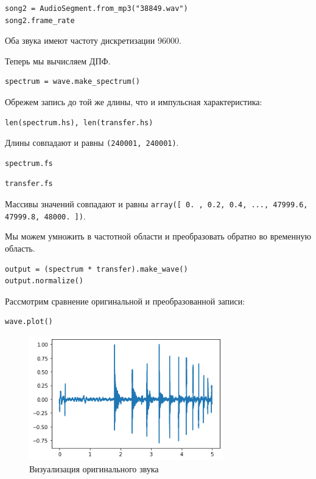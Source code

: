 \documentclass[a4paper,12pt]{report}
\begin{document}
\begin{lstlisting}[caption=Частота дискретизации 2]
song2 = AudioSegment.from_mp3("38849.wav")
song2.frame_rate
\end{lstlisting}

Оба звука имеют частоту дискретизации 96000.

Теперь мы вычисляем ДПФ.

\begin{lstlisting}[caption=Спектр звука]
spectrum = wave.make_spectrum()
\end{lstlisting}

Обрежем запись до той же длины, что и импульсная характеристика:

\begin{lstlisting}[caption=Длина записей]
len(spectrum.hs), len(transfer.hs)
\end{lstlisting}

Длины совпадают и равны \texttt{(240001, 240001)}.

\begin{lstlisting}[caption=Длина первой записи]
spectrum.fs
\end{lstlisting}

\begin{lstlisting}[caption=Длина второй записи]
transfer.fs
\end{lstlisting}

Массивы значений совпадают и равны \texttt{array([    0. ,     0.2,     0.4, ..., 47999.6, 47999.8, 48000. ])}.

Мы можем умножить в частотной области и преобразовать обратно во временную область.

\begin{lstlisting}[caption=Перемножение]
output = (spectrum * transfer).make_wave()
output.normalize()
\end{lstlisting}

Рассмотрим сравнение оригинальной и преобразованной записи:

\begin{lstlisting}[caption=Визуализация оригинального звука]
wave.plot()
\end{lstlisting}

\begin{figure}[H]
        \centering
        \includegraphics[width=0.75\textwidth]{13.png}
        \caption{Визуализация оригинального звука}
        \label{13}
\end{figure}
\end{document}
